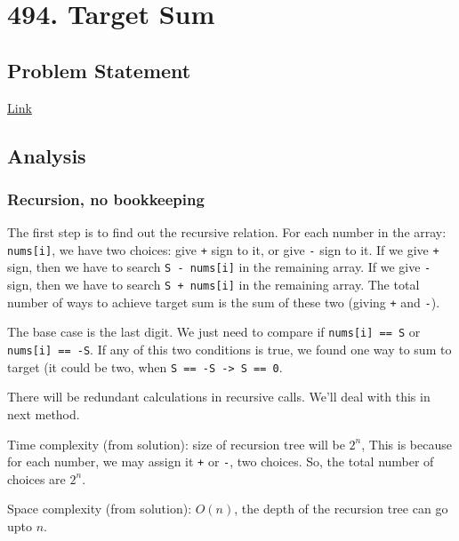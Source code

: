 \documentclass[12pt]{article}
\begin{document}
\section{494. Target Sum}
\label{sec:orgcecf8c6}
\subsection{Problem Statement}
\label{sec:org7c40ba1}
\href{https://leetcode.com/problems/target-sum/}{Link}
\subsection{Analysis}
\label{sec:org80eed7c}
\subsubsection{Recursion, no bookkeeping}
\label{sec:org262b46f}
The first step is to find out the recursive relation. For each number in the array: \texttt{nums[i]}, we have two choices: give \texttt{+} sign to it, or give \texttt{-} sign to it. If we give \texttt{+} sign, then we have to search \texttt{S - nums[i]} in the remaining array. If we give \texttt{-} sign, then we have to search \texttt{S + nums[i]} in the remaining array. The total number of ways to achieve target sum is the sum of these two (giving \texttt{+} and \texttt{-}).

The base case is the last digit. We just need to compare if \texttt{nums[i] == S} or \texttt{nums[i] == -S}. If any of this two conditions is true, we found one way to sum to target (it could be two, when \texttt{S == -S -> S == 0}.

There will be redundant calculations in recursive calls. We'll deal with this in next method.

Time complexity (from solution): size of recursion tree will be \(2^n\), This is because for each number, we may assign it \texttt{+} or \texttt{-}, two choices. So, the total number of choices are \(2^n\).

Space complexity (from solution): \(O(n)\), the depth of the recursion tree can go upto \(n\).
\end{document}
